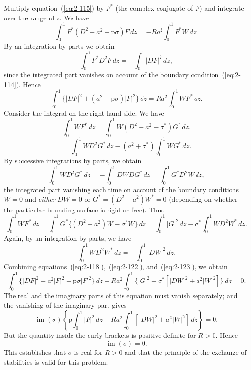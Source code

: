 Multiply equation~(\ref{eq:2-115}) by $F^*$ (the complex conjugate of $F$) and
integrate over the range of $z$. We have
\begin{equation}
\label{eq:2-116}
\int_0^1 F^*(D^2-a^2-\mathrm{p}\sigma)F\,dz = -Ra^2\!\int_0^1 F^*W\,dz.
\end{equation}
By an integration by parts we obtain
\begin{equation}
\label{eq:2-117}
\int_0^1 F^*D^2F\,dz = -\int_0^1 |DF|^2\,dz,
\end{equation}
since the integrated part vanishes on account of the boundary condition~(\ref{eq:2-114}). Hence
\begin{equation}
\label{eq:2-118}
\int_0^1 \{|DF|^2 + (a^2+\mathrm{p}\sigma)|F|^2\}\,dz = Ra^2\!\int_0^1 WF^*\,dz.
\end{equation}
Consider the integral on the right-hand side. We have
\begin{equation}
\label{eq:2-119}
\int_0^1 WF^*\,dz = \int_0^1 W(D^2-a^2-\sigma^*)G^*\,dz.
\end{equation}
\begin{equation}
\label{eq:2-120}
= \int_0^1 WD^2G^*\,dz - (a^2+\sigma^*)\!\int_0^1 WG^*\,dz.
\end{equation}
By successive integrations by parts, we obtain
\begin{equation}
\label{eq:2-121}
\int_0^1 WD^2G^*\,dz = -\int_0^1 DWDG^*\,dz = \int_0^1 G^*D^2W\,dz,
\end{equation}
the integrated part vanishing each time on account of the boundary
conditions $W = 0$ and \emph{either} $DW = 0$ or $G^* = (D^2-a^2)W^* = 0$
(depending on whether the particular bounding surface is rigid or free).
Thus
\begin{equation}
\label{eq:2-122}
\int_0^1 WF^*\,dz = \int_0^1 G^*\{(D^2-a^2)W - \sigma^*W\}\,dz = \int_0^1 |G|^2\,dz - \sigma^*\!\int_0^1 WD^2W^*\,dz.
\end{equation}
Again, by an integration by parts, we have
\begin{equation}
\label{eq:2-123}
\int_0^1 WD^2W^*\,dz = -\int_0^1 |DW|^2\,dz.
\end{equation}
Combining equations~(\ref{eq:2-118}),~(\ref{eq:2-122}), and~(\ref{eq:2-123}), we obtain
\begin{equation}
\label{eq:2-124}
\int_0^1 \{|DF|^2+a^2|F|^2+\mathrm{p}\sigma|F|^2\}\,dz - Ra^2\!\int_0^1\{|G|^2+\sigma^*[|DW|^2+a^2|W|^2]\}\,dz = 0.
\end{equation}
The real and the imaginary parts of this equation must vanish separately;
and the vanishing of the imaginary part gives
\begin{equation}
\label{eq:2-125}
\operatorname{im}(\sigma)\!\left\{\mathrm{p}\!\int_0^1|F|^2\,dz + Ra^2\!\int_0^1[|DW|^2+a^2|W|^2]\,dz\right\} = 0.
\end{equation}
But the quantity inside the curly brackets is positive definite for $R > 0$.
Hence
\begin{equation}
\label{eq:2-126}
\operatorname{im}(\sigma) = 0.
\end{equation}
This establishes that $\sigma$ is real for $R > 0$ and that the principle of the
exchange of stabilities is valid for this problem.

